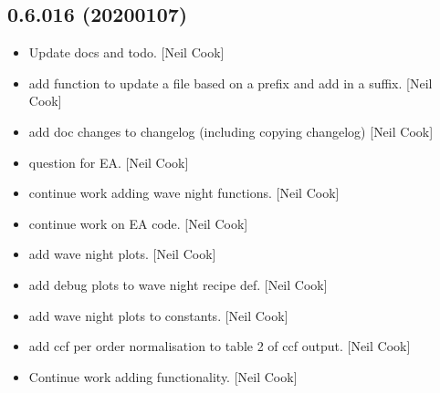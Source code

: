 \documentclass[a4paper,10pt,english]{report}
\begin{document}
\subsection{0.6.016 (2020\sphinxhyphen{}01\sphinxhyphen{}07)}
\label{\detokenize{misc/changelog:id22}}\begin{itemize}
\item {} 
Update docs \sphinxhyphen{}  and todo. {[}Neil Cook{]}

\item {} 
 \sphinxhyphen{} add function to update a
file based on a prefix and add in a suffix. {[}Neil Cook{]}

\item {} 
 \sphinxhyphen{} add doc changes to changelog
(including copying changelog) {[}Neil Cook{]}

\item {} 
 \sphinxhyphen{} question for EA. {[}Neil Cook{]}

\item {} 
 \sphinxhyphen{} continue work adding wave night functions.
{[}Neil Cook{]}

\item {} 
 \sphinxhyphen{} continue work on EA code.
{[}Neil Cook{]}

\item {} 
 \sphinxhyphen{} add wave night plots. {[}Neil Cook{]}

\item {} 
 \sphinxhyphen{} add debug plots to
wave night recipe def. {[}Neil Cook{]}

\item {} 
 \sphinxhyphen{} add wave night plots to
constants. {[}Neil Cook{]}

\item {} 
 \sphinxhyphen{} add ccf per order normalisation to table
2 of ccf output. {[}Neil Cook{]}

\item {} 
Continue work adding  functionality. {[}Neil Cook{]}


\end{itemize}
\end{document}
